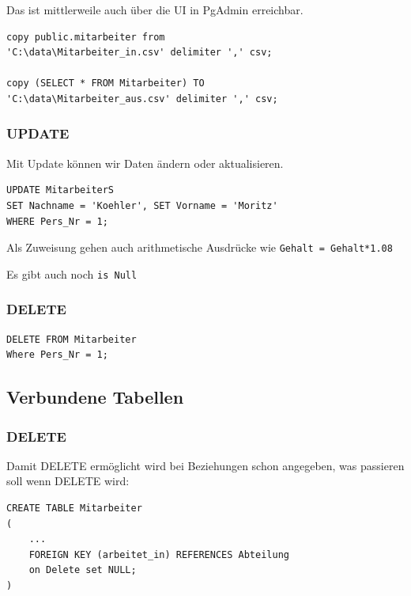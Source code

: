 \documentclass[a4paper]{article}
\begin{document}
Das ist mittlerweile auch über die UI in PgAdmin erreichbar.

\begin{lstlisting}
copy public.mitarbeiter from
'C:\data\Mitarbeiter_in.csv' delimiter ',' csv;

copy (SELECT * FROM Mitarbeiter) TO
'C:\data\Mitarbeiter_aus.csv' delimiter ',' csv;
\end{lstlisting}

\subsubsection{UPDATE}

Mit Update können wir Daten ändern oder aktualisieren.

\begin{lstlisting}
UPDATE MitarbeiterS
SET Nachname = 'Koehler', SET Vorname = 'Moritz'
WHERE Pers_Nr = 1;
\end{lstlisting}


Als Zuweisung gehen auch arithmetische Ausdrücke wie \lstinline|Gehalt = Gehalt*1.08|

Es gibt auch noch \lstinline|is Null|

\subsubsection{DELETE}

\begin{lstlisting}
DELETE FROM Mitarbeiter
Where Pers_Nr = 1;
\end{lstlisting}

\subsection{Verbundene Tabellen}


\subsubsection{DELETE}

Damit DELETE ermöglicht wird bei Beziehungen schon angegeben, was passieren soll wenn DELETE wird:

\begin{lstlisting}
CREATE TABLE Mitarbeiter
(
    ...
    FOREIGN KEY (arbeitet_in) REFERENCES Abteilung
    on Delete set NULL;
)
\end{lstlisting}
\end{document}
